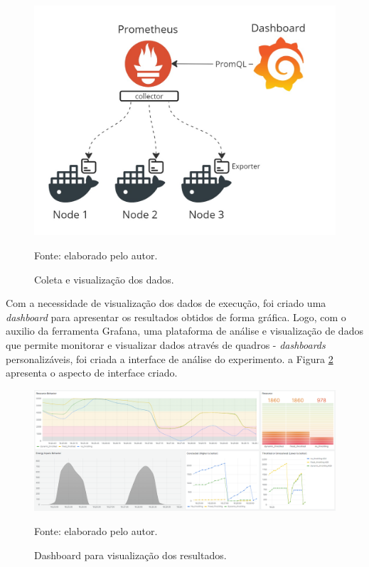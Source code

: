 \begin{figure}[H]
	\centering
	
	\caption{Coleta e visualização dos dados.}
	\label{fig:cap6instrumentalizacao}
	\noindent\includegraphics[width=0.75\linewidth]{Imagens/cap6/cap6instrumentalizacao.jpg} 
	
	Fonte: elaborado pelo autor.
\end{figure}


Com a necessidade de visualização dos dados de execução, foi criado uma \textit{dashboard}  para apresentar os resultados obtidos de forma gráfica. Logo, com o auxilio da ferramenta Grafana, uma plataforma de análise e visualização de dados que permite monitorar e visualizar dados através de quadros - \textit{dashboards} personalizáveis, foi criada a interface de análise do experimento. a Figura \ref{fig:cap6bashboard} apresenta o aspecto de interface criado.

\begin{figure}[H]
	\centering
	
	\caption{Dashboard para visualização dos resultados.}
	\label{fig:cap6bashboard}
	\noindent\includegraphics[width=1\linewidth]{Imagens/cap6/cap6dashboard.png} 
	
	Fonte: elaborado pelo autor.
\end{figure}

